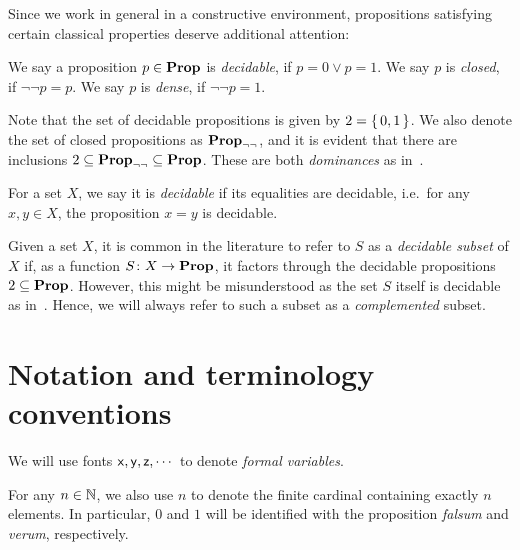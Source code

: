 Since we work in general in a constructive environment, propositions satisfying certain classical properties deserve additional attention:

\begin{definition}\label{def:propertiesofpropositions}
  We say a proposition $p \in \mathbf{Prop}$ is \emph{decidable}, if $p = 0 \vee p = 1$. We say $p$ is \emph{closed}, if $\neg\neg p = p$. We say $p$ is \emph{dense}, if $\neg\neg p = 1$. 
\end{definition}

\begin{remark}
  Note that the set of decidable propositions is given by $2 = \{\,0,1\,\}$. We also denote the set of closed propositions as $\mathbf{Prop}_{\neg\neg}$, and it is evident that there are inclusions $2 \subseteq \mathbf{Prop}_{\neg\neg} \subseteq \mathbf{Prop}$. These are both \emph{dominances} as in~.
\end{remark}

\begin{definition}\label{def:decidableset}
  For a set $X$, we say it is \emph{decidable} if its equalities are decidable, i.e.\ for any $x,y\in X$, the proposition $x = y$ is decidable.
\end{definition}

\begin{remark}\label{rem:complementedsubtype}
  Given a set $X$, it is common in the literature to refer to $S$ as a \emph{decidable subset} of $X$ if, as a function $S \colon X \to \mathbf{Prop}$, it factors through the decidable propositions $2 \subseteq \mathbf{Prop}$. However, this might be misunderstood as the set $S$ itself is decidable as in~. Hence, we will always refer to such a subset as a \emph{complemented} subset.
\end{remark}


\section{Notation and terminology conventions}\label{sec:notation}

We will use fonts $\mathsf{x},\mathsf{y},\mathsf{z},\cdots$ to denote \emph{formal variables}.

For any $n\in\mathbb{N}$, we also use $n$ to denote the finite cardinal containing exactly $n$ elements. In particular, $0$ and $1$ will be identified with the proposition \emph{falsum} and \emph{verum}, respectively.

